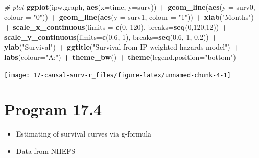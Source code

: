 \documentclass[
  10pt,
]{book}
\newenvironment{Shaded}{\begin{snugshade}}{\end{snugshade}}
\newcommand{\CommentTok}[1]{\textcolor[rgb]{0.56,0.35,0.01}{\textit{#1}}}
\newcommand{\DataTypeTok}[1]{\textcolor[rgb]{0.13,0.29,0.53}{#1}}
\newcommand{\DecValTok}[1]{\textcolor[rgb]{0.00,0.00,0.81}{#1}}
\newcommand{\FloatTok}[1]{\textcolor[rgb]{0.00,0.00,0.81}{#1}}
\newcommand{\KeywordTok}[1]{\textcolor[rgb]{0.13,0.29,0.53}{\textbf{#1}}}
\newcommand{\NormalTok}[1]{#1}
\newcommand{\OperatorTok}[1]{\textcolor[rgb]{0.81,0.36,0.00}{\textbf{#1}}}
\newcommand{\StringTok}[1]{\textcolor[rgb]{0.31,0.60,0.02}{#1}}
\providecommand{\tightlist}{%
  \setlength{\itemsep}{0pt}\setlength{\parskip}{0pt}}
\begin{document}
\begin{Shaded}
\begin{Highlighting}[]
\CommentTok{# plot}
\KeywordTok{ggplot}\NormalTok{(ipw.graph, }\KeywordTok{aes}\NormalTok{(}\DataTypeTok{x=}\NormalTok{time, }\DataTypeTok{y=}\NormalTok{surv)) }\OperatorTok{+}\StringTok{ }
\StringTok{  }\KeywordTok{geom_line}\NormalTok{(}\KeywordTok{aes}\NormalTok{(}\DataTypeTok{y =}\NormalTok{ surv0, }\DataTypeTok{colour =} \StringTok{"0"}\NormalTok{)) }\OperatorTok{+}\StringTok{ }
\StringTok{  }\KeywordTok{geom_line}\NormalTok{(}\KeywordTok{aes}\NormalTok{(}\DataTypeTok{y =}\NormalTok{ surv1, }\DataTypeTok{colour =} \StringTok{"1"}\NormalTok{)) }\OperatorTok{+}\StringTok{ }
\StringTok{  }\KeywordTok{xlab}\NormalTok{(}\StringTok{"Months"}\NormalTok{) }\OperatorTok{+}\StringTok{ }
\StringTok{  }\KeywordTok{scale_x_continuous}\NormalTok{(}\DataTypeTok{limits =} \KeywordTok{c}\NormalTok{(}\DecValTok{0}\NormalTok{, }\DecValTok{120}\NormalTok{), }\DataTypeTok{breaks=}\KeywordTok{seq}\NormalTok{(}\DecValTok{0}\NormalTok{,}\DecValTok{120}\NormalTok{,}\DecValTok{12}\NormalTok{)) }\OperatorTok{+}
\StringTok{  }\KeywordTok{scale_y_continuous}\NormalTok{(}\DataTypeTok{limits=}\KeywordTok{c}\NormalTok{(}\FloatTok{0.6}\NormalTok{, }\DecValTok{1}\NormalTok{), }\DataTypeTok{breaks=}\KeywordTok{seq}\NormalTok{(}\FloatTok{0.6}\NormalTok{, }\DecValTok{1}\NormalTok{, }\FloatTok{0.2}\NormalTok{)) }\OperatorTok{+}
\StringTok{  }\KeywordTok{ylab}\NormalTok{(}\StringTok{"Survival"}\NormalTok{) }\OperatorTok{+}\StringTok{ }
\StringTok{  }\KeywordTok{ggtitle}\NormalTok{(}\StringTok{"Survival from IP weighted hazards model"}\NormalTok{) }\OperatorTok{+}\StringTok{ }
\StringTok{  }\KeywordTok{labs}\NormalTok{(}\DataTypeTok{colour=}\StringTok{"A:"}\NormalTok{) }\OperatorTok{+}
\StringTok{  }\KeywordTok{theme_bw}\NormalTok{() }\OperatorTok{+}\StringTok{ }
\StringTok{  }\KeywordTok{theme}\NormalTok{(}\DataTypeTok{legend.position=}\StringTok{"bottom"}\NormalTok{)}
\end{Highlighting}
\end{Shaded}

\begin{center}\texttt{[image: 17-causal-surv-r\_files/figure-latex/unnamed-chunk-4-1]} \end{center}

\hypertarget{program-17.4}{%
\section{Program 17.4}\label{program-17.4}}

\begin{itemize}
\tightlist
\item
  Estimating of survival curves via g-formula
\item
  Data from NHEFS
\end{itemize}
\end{document}

